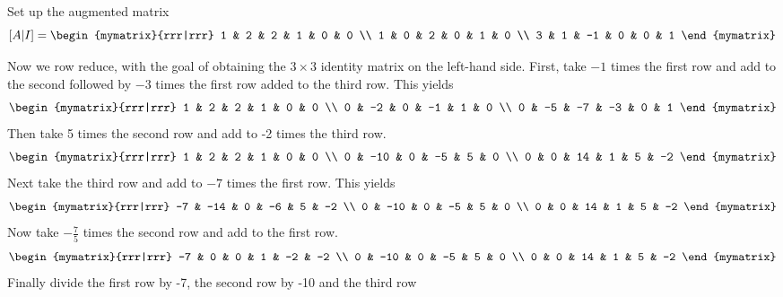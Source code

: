 \begin{solution} Set up the augmented matrix
\begin{equation*}
\mat{A|I} =  
\begin{mymatrix}{rrr|rrr}
1 & 2 & 2 & 1 & 0 & 0 \\
1 & 0 & 2 & 0 & 1 & 0 \\
3 & 1 & -1 & 0 & 0 & 1
\end{mymatrix}
\end{equation*}

Now we row reduce, with the goal of obtaining the $3 \times 3$ identity matrix on the left-hand side.
First, take $-1 $ times the first row and add to the second
followed by $-3 $ times the first row added to the third row. This
yields
\begin{equation*}
\allowbreak \begin{mymatrix}{rrr|rrr}
1 & 2 & 2 & 1 & 0 & 0 \\
0 & -2 & 0 & -1 & 1 & 0 \\
0 & -5 & -7 & -3 & 0 & 1
\end{mymatrix} 
\end{equation*}
Then take 5 times the second row and add to -2 times the third row.
\begin{equation*}
\begin{mymatrix}{rrr|rrr}
1 & 2 & 2 & 1 & 0 & 0 \\
0 & -10 & 0 & -5 & 5 & 0 \\
0 & 0 & 14 & 1 & 5 & -2
\end{mymatrix}
\end{equation*}
Next take the third row and add to $ -7$ times the first row.
This yields
\begin{equation*}
\begin{mymatrix}{rrr|rrr}
-7 & -14 & 0 & -6 & 5 & -2 \\
0 & -10 & 0 & -5 & 5 & 0 \\
0 & 0 & 14 & 1 & 5 & -2
\end{mymatrix} 
\end{equation*}
Now take $ -\frac{7}{5}$ times the second row and add to the first row.
\begin{equation*}
 \begin{mymatrix}{rrr|rrr}
-7 & 0 & 0 & 1 & -2 & -2 \\
0 & -10 & 0 & -5 & 5 & 0 \\
0 & 0 & 14 & 1 & 5 & -2
\end{mymatrix} 
\end{equation*}
Finally divide the first row by -7, the second row by -10 and the third row

\end{solution}

